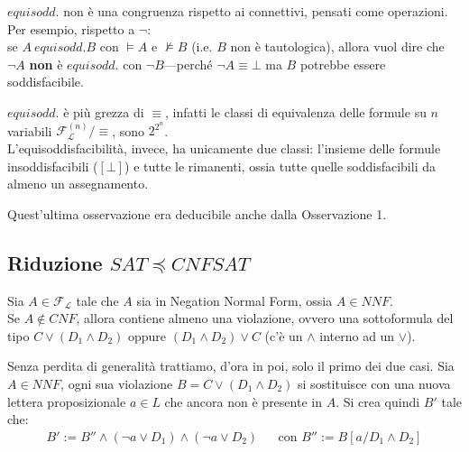 \begin{ossn}
$equisodd.$ non è una congruenza rispetto ai connettivi, pensati come operazioni. \\
Per esempio, rispetto a $\neg$: \\
se $A\ equisodd. B$ con $\models A$ e $\nvDash B$ (i.e. $B$ non è tautologica), allora vuol dire che $\neg A$ \textbf{non} è $equisodd.$ con $\neg B$—perché $\neg A \equiv \bot$ ma $B$ potrebbe essere soddisfacibile.
\end{ossn}

\begin{ossn} $equisodd.$ è più grezza di $\equiv$, infatti le classi di equivalenza delle formule su $n$ variabili $\mathscr{F}_\mathscr{L}^{(n)}/\equiv$, sono $2^{2^n}$. \\
L'equisoddisfacibilità, invece, ha unicamente due classi: l'insieme delle formule insoddisfacibili ($[\bot]$) e tutte le rimanenti, ossia tutte quelle soddisfacibili da almeno un assegnamento.
\end{ossn}
Quest'ultima osservazione era deducibile anche dalla Osservazione 1.

\subsection{Riduzione $SAT \preceq CNFSAT$}
Sia $A \in \mathscr{F}_\mathscr{L}$ tale che $A$ sia in Negation Normal Form, ossia $A \in NNF$. \\
Se $A \notin CNF$, allora contiene almeno una violazione, ovvero una sottoformula del tipo $C \lor (D_1 \land D_2)$ oppure $(D_1 \land D_2) \lor C$ (c'è un $\land$ interno ad un $\lor$).

Senza perdita di generalità trattiamo, d'ora in poi, solo il primo dei due casi. Sia $A \in NNF$, ogni sua violazione $B = C \lor (D_1 \land D_2)$ si sostituisce con una nuova lettera proposizionale $a \in L$ che ancora non è presente in $A$. Si crea quindi $B'$ tale che:
\begin{align*}
B' := B'' \land (\neg a \lor D_1) \land (\neg a \lor D_2)
&&
\text{con } B'' := B[a/D_1\land D_2]
\end{align*}

